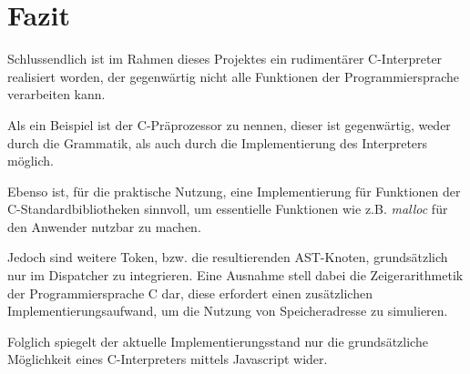 \documentclass[]{lni}
\begin{document}
\section{Fazit}

Schlussendlich ist im Rahmen dieses Projektes ein rudimentärer C-Interpreter realisiert worden, der gegenwärtig nicht alle Funktionen der Programmiersprache verarbeiten kann. 

Als ein Beispiel ist der C-Präprozessor zu nennen, dieser ist gegenwärtig, weder durch die Grammatik, als auch durch die Implementierung des Interpreters möglich. 

Ebenso ist, für die praktische Nutzung, eine Implementierung für Funktionen der C-Standardbibliotheken sinnvoll, um essentielle Funktionen wie z.B. \textit{malloc} für den Anwender nutzbar zu machen.

Jedoch sind weitere Token, bzw. die resultierenden AST-Knoten, grundsätzlich nur im Dispatcher zu integrieren. Eine Ausnahme stell dabei die Zeigerarithmetik der Programmiersprache C dar, diese erfordert einen zusätzlichen Implementierungsaufwand, um die Nutzung von Speicheradresse zu simulieren. 

Folglich spiegelt der aktuelle Implementierungsstand nur die grundsätzliche Möglichkeit eines C-Interpreters mittels Javascript wider. 
\newpage
\end{document}
